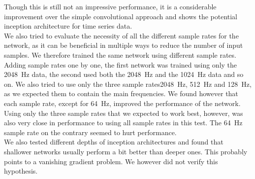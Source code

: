 Though this is still not an impressive performance, it is a considerable improvement over the simple convolutional approach and shows the potential inception architecture for time series data.\medskip\\
We also tried to evaluate the necessity of all the different sample rates for the network, as it can be beneficial in multiple ways to reduce the number of input samples. We therefore trained the same network using different sample rates. Adding sample rates one by one, the first network was trained using only the \SI{2048}{\hertz} data, the second used both the \SI{2048}{\hertz} and the \SI{1024}{\hertz} data and so on. We also tried to use only the three sample rates\SI{2048}{\hertz}, \SI{512}{\hertz} and \SI{128}{\hertz}, as we expected them to contain the main frequencies. We found however that each sample rate, except for \SI{64}{\hertz}, improved the performance of the network. Using only the three sample rates that we expected to work best, however, was also very close in performance to using all sample rates in this test. The \SI{64}{\hertz} sample rate on the contrary seemed to hurt performance.\\
We also tested different depths of inception architectures and found that shallower networks usually perform a bit better than deeper ones. This probably points to a vanishing gradient problem. We however did not verify this hypothesis.
